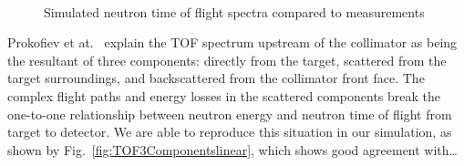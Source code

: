 \documentclass[12pt,journal]{IEEEtran}
\let\MYoriglatexcaption\caption
\renewcommand{\caption}[2][\relax]{\MYoriglatexcaption[#2]{#2}}
\begin{document}
\begin{figure}[!t]
	\centering
	\\
    \caption{Simulated neutron time of flight spectra compared to measurements}
    \label{fig:TOFSpectra}
\end{figure}

Prokofiev et at.~\cite{Prokofiev14} explain the TOF spectrum upstream of the collimator as being the resultant of three components: directly from the target, scattered from the target surroundings, and backscattered from the collimator front face.
The complex flight paths and energy losses in the scattered components break the one-to-one relationship between neutron energy and neutron time of flight from target to detector.
We are able to reproduce this situation in our simulation, as shown by Fig.~\ref{fig:TOF3Componentslinear}, which shows good agreement with\ldots{}
\end{document}
